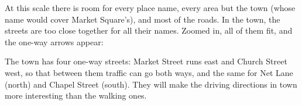 At this scale there is room for every place name, every area but the town
(whose name would cover Market Square's), and most of the roads. In the
town, the streets are too close together for all their names. Zoomed in,
all of them fit, and the one-way arrows appear:


The town has four one-way streets: Market Street runs east and Church
Street west, so that between them traffic can go both ways, and the same
for Net Lane (north) and Chapel Street (south). They will make the
driving directions in town more interesting than the walking ones.
